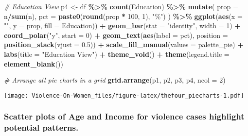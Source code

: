 \documentclass[
]{article}
\newenvironment{Shaded}{\begin{snugshade}}{\end{snugshade}}
\newcommand{\AttributeTok}[1]{\textcolor[rgb]{0.13,0.29,0.53}{#1}}
\newcommand{\CommentTok}[1]{\textcolor[rgb]{0.56,0.35,0.01}{\textit{#1}}}
\newcommand{\DecValTok}[1]{\textcolor[rgb]{0.00,0.00,0.81}{#1}}
\newcommand{\FloatTok}[1]{\textcolor[rgb]{0.00,0.00,0.81}{#1}}
\newcommand{\FunctionTok}[1]{\textcolor[rgb]{0.13,0.29,0.53}{\textbf{#1}}}
\newcommand{\NormalTok}[1]{#1}
\newcommand{\OtherTok}[1]{\textcolor[rgb]{0.56,0.35,0.01}{#1}}
\newcommand{\SpecialCharTok}[1]{\textcolor[rgb]{0.81,0.36,0.00}{\textbf{#1}}}
\newcommand{\StringTok}[1]{\textcolor[rgb]{0.31,0.60,0.02}{#1}}
\begin{document}
\begin{Shaded}
\begin{Highlighting}[]
\CommentTok{\# Education View}
\NormalTok{p4 }\OtherTok{\textless{}{-}}\NormalTok{ df }\SpecialCharTok{\%\textgreater{}\%}
  \FunctionTok{count}\NormalTok{(Education) }\SpecialCharTok{\%\textgreater{}\%}
  \FunctionTok{mutate}\NormalTok{(}
    \AttributeTok{prop =}\NormalTok{ n}\SpecialCharTok{/}\FunctionTok{sum}\NormalTok{(n),}
    \AttributeTok{pct =} \FunctionTok{paste0}\NormalTok{(}\FunctionTok{round}\NormalTok{(prop }\SpecialCharTok{*} \DecValTok{100}\NormalTok{, }\DecValTok{1}\NormalTok{), }\StringTok{"\%"}\NormalTok{)}
\NormalTok{  ) }\SpecialCharTok{\%\textgreater{}\%}
  \FunctionTok{ggplot}\NormalTok{(}\FunctionTok{aes}\NormalTok{(}\AttributeTok{x =} \StringTok{""}\NormalTok{, }\AttributeTok{y =}\NormalTok{ prop, }\AttributeTok{fill =}\NormalTok{ Education)) }\SpecialCharTok{+}
  \FunctionTok{geom\_bar}\NormalTok{(}\AttributeTok{stat =} \StringTok{"identity"}\NormalTok{, }\AttributeTok{width =} \DecValTok{1}\NormalTok{) }\SpecialCharTok{+}
  \FunctionTok{coord\_polar}\NormalTok{(}\StringTok{"y"}\NormalTok{, }\AttributeTok{start =} \DecValTok{0}\NormalTok{) }\SpecialCharTok{+}
  \FunctionTok{geom\_text}\NormalTok{(}\FunctionTok{aes}\NormalTok{(}\AttributeTok{label =}\NormalTok{ pct), }\AttributeTok{position =} \FunctionTok{position\_stack}\NormalTok{(}\AttributeTok{vjust =} \FloatTok{0.5}\NormalTok{)) }\SpecialCharTok{+}
  \FunctionTok{scale\_fill\_manual}\NormalTok{(}\AttributeTok{values =}\NormalTok{ palette\_pie) }\SpecialCharTok{+}
  \FunctionTok{labs}\NormalTok{(}\AttributeTok{title =} \StringTok{"Education View"}\NormalTok{) }\SpecialCharTok{+}
  \FunctionTok{theme\_void}\NormalTok{() }\SpecialCharTok{+}
  \FunctionTok{theme}\NormalTok{(}\AttributeTok{legend.title =} \FunctionTok{element\_blank}\NormalTok{())}

\CommentTok{\# Arrange all pie charts in a grid}
\FunctionTok{grid.arrange}\NormalTok{(p1, p2, p3, p4, }\AttributeTok{ncol =} \DecValTok{2}\NormalTok{)}
\end{Highlighting}
\end{Shaded}

\texttt{[image: Violence-On-Women\_files/figure-latex/thefour\_piecharts-1.pdf]}

\hypertarget{scatter-plots-of-age-and-income-for-violence-cases-highlight-potential-patterns.}{%
\subsubsection{Scatter plots of Age and Income for violence cases
highlight potential
patterns.}\label{scatter-plots-of-age-and-income-for-violence-cases-highlight-potential-patterns.}}
\end{document}
